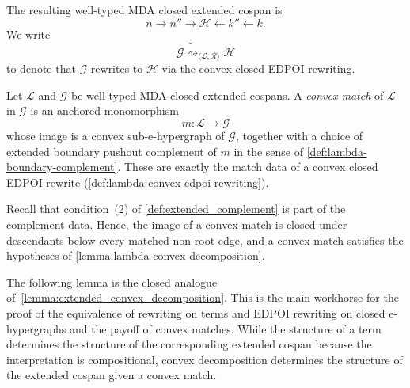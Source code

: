 \begin{definition}
The resulting well-typed MDA closed extended cospan is
\[
  n
  \longrightarrow
  n''
  \longrightarrow
  \mathcal H
  \longleftarrow
  k''
  \longleftarrow
  k.
\]
We write
\[
  \mathcal G
  \mathrel{
    \widetilde{\rightsquigarrow}_{
      \langle\mathcal L,\mathcal R\rangle
    }
  }
  \mathcal H
\]
to denote that $\mathcal{G}$ rewrites to $\mathcal{H}$ via the convex closed EDPOI rewriting.
\end{definition}

\begin{definition}
\label{def:lambda-convex-match}
Let $\mathcal L$ and $\mathcal G$ be well-typed MDA closed extended
cospans. A \emph{convex match} of $\mathcal L$ in $\mathcal G$ is an
anchored monomorphism
\[
  m:\mathcal L\longrightarrow\mathcal G
\]
whose image is a convex sub-e-hypergraph of $\mathcal G$, together with
a choice of extended boundary pushout complement of $m$ in the sense of
\cref{def:lambda-boundary-complement}. These are exactly the match data
of a convex closed EDPOI rewrite
(\cref{def:lambda-convex-edpoi-rewriting}).

Recall that condition~(2) of \cref{def:extended_complement} is part of
the complement data. Hence, the image of a convex match is closed under
descendants below every matched non-root edge, and a convex match
satisfies the hypotheses of \cref{lemma:lambda-convex-decomposition}.
\end{definition}

The following lemma is the closed analogue of~\cref{lemma:extended_convex_decomposition}.
This is the main workhorse for the proof of the equivalence of rewriting on terms and EDPOI rewriting on closed e-hypergraphs and the payoff of convex matches.
While the structure of a term determines the structure of the corresponding extended cospan because the interpretation is compositional, convex decomposition determines the structure of the extended cospan given a convex match.

